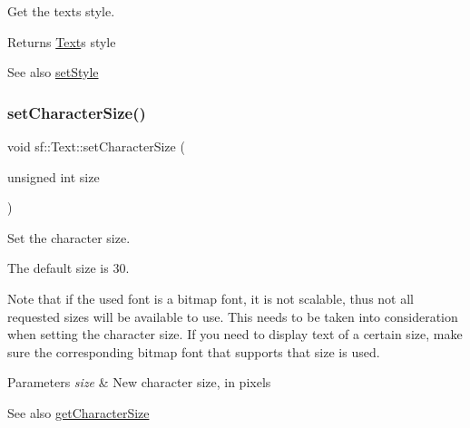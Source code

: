 Get the text\textquotesingle{}s style. 

\begin{DoxyReturn}{Returns}
\mbox{\hyperlink{classsf_1_1_text}{Text}}\textquotesingle{}s style
\end{DoxyReturn}
\begin{DoxySeeAlso}{See also}
\mbox{\hyperlink{classsf_1_1_text_ad791702bc2d1b6590a1719aa60635edf}{set\+Style}} \begin{DoxyVerb}\end{DoxyVerb}
 
\end{DoxySeeAlso}
\mbox{\label{classsf_1_1_text_ae96f835fc1bff858f8a23c5b01eaaf7e}} 
\subsubsection{\texorpdfstring{setCharacterSize()}{setCharacterSize()}}
{\footnotesize\ttfamily void sf\+::\+Text\+::set\+Character\+Size (\begin{DoxyParamCaption}\item[{unsigned int}]{size }\end{DoxyParamCaption})}



Set the character size. 

The default size is 30.

Note that if the used font is a bitmap font, it is not scalable, thus not all requested sizes will be available to use. This needs to be taken into consideration when setting the character size. If you need to display text of a certain size, make sure the corresponding bitmap font that supports that size is used.


\begin{DoxyParams}{Parameters}
{\em size} & New character size, in pixels\\
\hline
\end{DoxyParams}
\begin{DoxySeeAlso}{See also}
\mbox{\hyperlink{classsf_1_1_text_a46d1d7f1d513bb8d434e985a93ea5224}{get\+Character\+Size}} \begin{DoxyVerb}\end{DoxyVerb}
 
\end{DoxySeeAlso}
\mbox{\label{classsf_1_1_text_a6ce65272d6d63ed01118366e92c68132}} 
